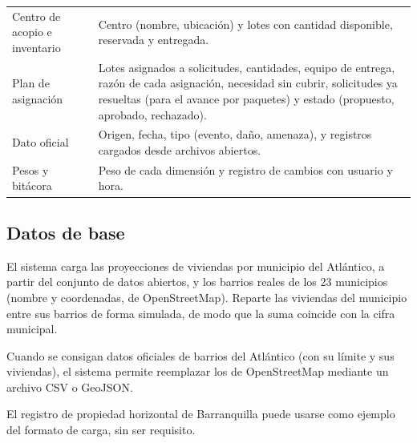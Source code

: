 \begin{table}[H]
\begin{tabularx}{\textwidth}{@{}p{3.2cm}X@{}}
Centro de acopio e inventario & Centro (nombre, ubicación) y lotes con cantidad disponible, reservada y entregada. \\
Plan de asignación & Lotes asignados a solicitudes, cantidades, equipo de entrega, razón de cada asignación, necesidad sin cubrir, solicitudes ya resueltas (para el avance por paquetes) y estado (propuesto, aprobado, rechazado). \\
Dato oficial & Origen, fecha, tipo (evento, daño, amenaza), y registros cargados desde archivos abiertos. \\
Pesos y bitácora & Peso de cada dimensión y registro de cambios con usuario y hora. \\
\bottomrule
\end{tabularx}
\end{table}

\subsection{Datos de base}
\begin{description}[leftmargin=0pt]
  \item[RD-01 (\Must).] El sistema carga las proyecciones de viviendas por municipio del Atlántico, a partir del conjunto de datos abiertos, y los barrios reales de los 23 municipios (nombre y coordenadas, de OpenStreetMap). Reparte las viviendas del municipio entre sus barrios de forma simulada, de modo que la suma coincide con la cifra municipal.
  \item[RD-02 (\Should).] Cuando se consigan datos oficiales de barrios del Atlántico (con su límite y sus viviendas), el sistema permite reemplazar los de OpenStreetMap mediante un archivo CSV o GeoJSON.
  \item[RD-03 (\Could).] El registro de propiedad horizontal de Barranquilla puede usarse como ejemplo del formato de carga, sin ser requisito.
\end{description}

